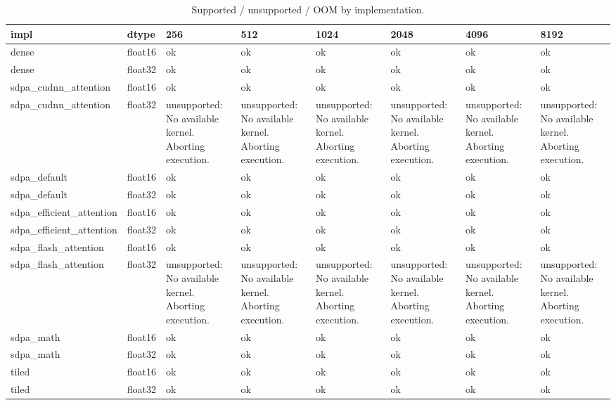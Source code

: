 \begin{table}
\caption{Supported / unsupported / OOM by implementation.}
\label{tab:task2a_backend_status}
\begin{tabular}{llllllll}
\toprule
impl & dtype & 256 & 512 & 1024 & 2048 & 4096 & 8192 \\
\midrule
dense & float16 & ok & ok & ok & ok & ok & ok \\
dense & float32 & ok & ok & ok & ok & ok & ok \\
sdpa\_cudnn\_attention & float16 & ok & ok & ok & ok & ok & ok \\
sdpa\_cudnn\_attention & float32 & unsupported: No available kernel. Aborting execution. & unsupported: No available kernel. Aborting execution. & unsupported: No available kernel. Aborting execution. & unsupported: No available kernel. Aborting execution. & unsupported: No available kernel. Aborting execution. & unsupported: No available kernel. Aborting execution. \\
sdpa\_default & float16 & ok & ok & ok & ok & ok & ok \\
sdpa\_default & float32 & ok & ok & ok & ok & ok & ok \\
sdpa\_efficient\_attention & float16 & ok & ok & ok & ok & ok & ok \\
sdpa\_efficient\_attention & float32 & ok & ok & ok & ok & ok & ok \\
sdpa\_flash\_attention & float16 & ok & ok & ok & ok & ok & ok \\
sdpa\_flash\_attention & float32 & unsupported: No available kernel. Aborting execution. & unsupported: No available kernel. Aborting execution. & unsupported: No available kernel. Aborting execution. & unsupported: No available kernel. Aborting execution. & unsupported: No available kernel. Aborting execution. & unsupported: No available kernel. Aborting execution. \\
sdpa\_math & float16 & ok & ok & ok & ok & ok & ok \\
sdpa\_math & float32 & ok & ok & ok & ok & ok & ok \\
tiled & float16 & ok & ok & ok & ok & ok & ok \\
tiled & float32 & ok & ok & ok & ok & ok & ok \\
\bottomrule
\end{tabular}
\end{table}
